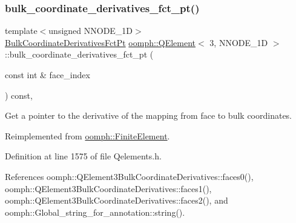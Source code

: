 \subsubsection{\texorpdfstring{bulk\+\_\+coordinate\+\_\+derivatives\+\_\+fct\+\_\+pt()}{bulk\_coordinate\_derivatives\_fct\_pt()}}
{\footnotesize\ttfamily template$<$unsigned N\+N\+O\+D\+E\+\_\+1D$>$ \\
\hyperlink{namespaceoomph_a0a75fbfa1139f00cf88adeee835c8fe5}{Bulk\+Coordinate\+Derivatives\+Fct\+Pt} \hyperlink{classoomph_1_1QElement}{oomph\+::\+Q\+Element}$<$ 3, N\+N\+O\+D\+E\+\_\+1D $>$\+::bulk\+\_\+coordinate\+\_\+derivatives\+\_\+fct\+\_\+pt (\begin{DoxyParamCaption}\item[{const int \&}]{face\+\_\+index }\end{DoxyParamCaption}) const\hspace{0.3cm}{\ttfamily [inline]}, {\ttfamily [virtual]}}

Get a pointer to the derivative of the mapping from face to bulk coordinates. 

Reimplemented from \hyperlink{classoomph_1_1FiniteElement_a8b29bbf8e20cf2ccf91674ca09ed80aa}{oomph\+::\+Finite\+Element}.



Definition at line 1575 of file Qelements.\+h.



References oomph\+::\+Q\+Element3\+Bulk\+Coordinate\+Derivatives\+::faces0(), oomph\+::\+Q\+Element3\+Bulk\+Coordinate\+Derivatives\+::faces1(), oomph\+::\+Q\+Element3\+Bulk\+Coordinate\+Derivatives\+::faces2(), and oomph\+::\+Global\+\_\+string\+\_\+for\+\_\+annotation\+::string().

\mbox{\label{classoomph_1_1QElement_3_013_00_01NNODE__1D_01_4_a9ebd0a45dd270da11d14cffe6eed6f13}} 
